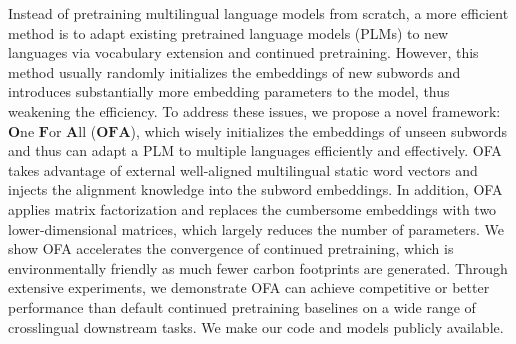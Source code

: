 Instead of pretraining multilingual language models from scratch, a more efficient method is to adapt existing pretrained language models (PLMs) to new languages via vocabulary extension and continued pretraining. However, this method usually randomly initializes the embeddings of new subwords and introduces substantially more embedding parameters to the model, thus weakening the efficiency. To address these issues, we propose a novel framework: $\textbf{O}$ne $\textbf{F}$or $\textbf{A}$ll ($\textbf{OFA}$), which wisely initializes the embeddings of unseen subwords and thus can adapt a PLM to multiple languages efficiently and effectively. OFA takes advantage of external well-aligned multilingual static word vectors and injects the alignment knowledge into the subword embeddings. In addition, OFA applies matrix factorization and replaces the cumbersome embeddings with two lower-dimensional matrices, which largely reduces the number of parameters. We show OFA accelerates the convergence of continued pretraining, which is environmentally friendly as much fewer carbon footprints are generated. Through extensive experiments, we demonstrate OFA can achieve competitive or better performance than default continued pretraining baselines on a wide range of crosslingual downstream tasks. We make our code and models publicly available.